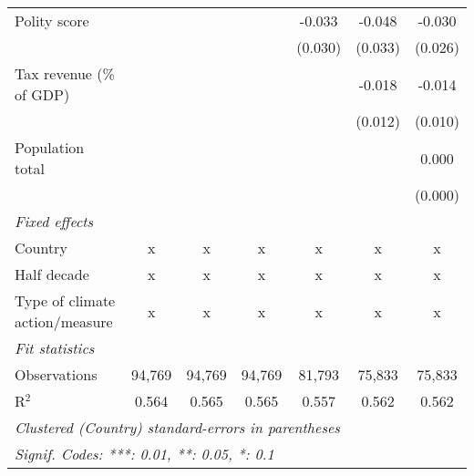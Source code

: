 \begin{tabular}{lcccccc}
   Polity score                                                           &         &               &                & -0.033         & -0.048         & -0.030\\   
                                                                          &         &               &                & (0.030)        & (0.033)        & (0.026)\\   
   Tax revenue (\% of GDP)                                                &         &               &                &                & -0.018         & -0.014\\   
                                                                          &         &               &                &                & (0.012)        & (0.010)\\   
   Population total                                                       &         &               &                &                &                & 0.000\\   
                                                                          &         &               &                &                &                & (0.000)\\   
   \emph{Fixed effects}\\
   Country                                                                & x       & x             & x              & x              & x              & x\\  
   Half decade                                                            & x       & x             & x              & x              & x              & x\\  
   Type of climate action/measure                                         & x       & x             & x              & x              & x              & x\\  
   \midrule \emph{Fit statistics}\\
   Observations                                                           & 94,769  & 94,769        & 94,769         & 81,793         & 75,833         & 75,833\\  
   R$^2$                                                                  & 0.564   & 0.565         & 0.565          & 0.557          & 0.562          & 0.562\\  
   \midrule
   \multicolumn{7}{l}{\emph{Clustered (Country) standard-errors in parentheses}}\\
   \multicolumn{7}{l}{\emph{Signif. Codes: ***: 0.01, **: 0.05, *: 0.1}}\\
\end{tabular}
\par\endgroup


